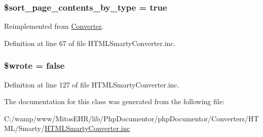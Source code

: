 \hypertarget{class_h_t_m_l_smarty_converter_ab5dae87e1968b35e37687a763216a835}{
\subsubsection[{\$sort\-\_\-page\-\_\-contents\-\_\-by\-\_\-type}]{\setlength{\rightskip}{0pt plus 5cm}\$sort\-\_\-page\-\_\-contents\-\_\-by\-\_\-type = true}}\label{class_h_t_m_l_smarty_converter_ab5dae87e1968b35e37687a763216a835}


\-Reimplemented from \hyperlink{class_converter_ab5dae87e1968b35e37687a763216a835}{\-Converter}.



\-Definition at line 67 of file \-H\-T\-M\-L\-Smarty\-Converter.\-inc.

\hypertarget{class_h_t_m_l_smarty_converter_a2cf37faa5637b7639b816f3e61485a30}{
\subsubsection[{\$wrote}]{\setlength{\rightskip}{0pt plus 5cm}\$wrote = false}}\label{class_h_t_m_l_smarty_converter_a2cf37faa5637b7639b816f3e61485a30}


\-Definition at line 127 of file \-H\-T\-M\-L\-Smarty\-Converter.\-inc.



\-The documentation for this class was generated from the following file\-:\begin{DoxyCompactItemize}
\item 
\-C\-:/wamp/www/\-Mitos\-E\-H\-R/lib/\-Php\-Documentor/php\-Documentor/\-Converters/\-H\-T\-M\-L/\-Smarty/\hyperlink{_h_t_m_l_smarty_converter_8inc}{\-H\-T\-M\-L\-Smarty\-Converter.\-inc}\end{DoxyCompactItemize}
